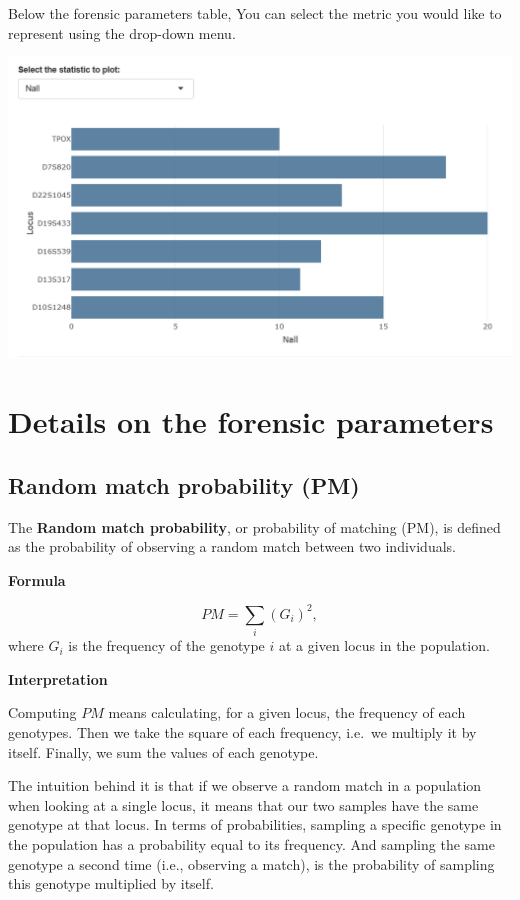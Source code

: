 \documentclass[
]{book}
\begin{document}
Below the forensic parameters table, You can select the metric you would like
to represent using the drop-down menu.

\includegraphics[width=0.8\linewidth]{img/capture_forensics_parameters_2}

\hypertarget{details-on-the-forensic-parameters}{%
\section{Details on the forensic parameters}\label{details-on-the-forensic-parameters}}

\hypertarget{random-match-probability-pm}{%
\subsection{Random match probability (PM)}\label{random-match-probability-pm}}

The \textbf{Random match probability}, or probability of matching (PM), is defined as
the probability of observing a random match between two individuals.

\textbf{Formula}

\[
PM = \sum_i (G_i)^2,
\]
where \(G_i\) is the frequency of the genotype \(i\) at a given locus in the population.

\textbf{Interpretation}

Computing \(PM\) means calculating, for a given locus, the frequency of each
genotypes. Then we take the square of each frequency, i.e.~we multiply it by itself.
Finally, we sum the values of each genotype.

The intuition behind it is that if we observe a random match in a population when looking
at a single locus, it means that our two samples have the same genotype at that locus.
In terms of probabilities, sampling a specific genotype in the population has a probability
equal to its frequency. And sampling the same genotype a second time (i.e., observing a match),
is the probability of sampling this genotype multiplied by itself.
\end{document}
